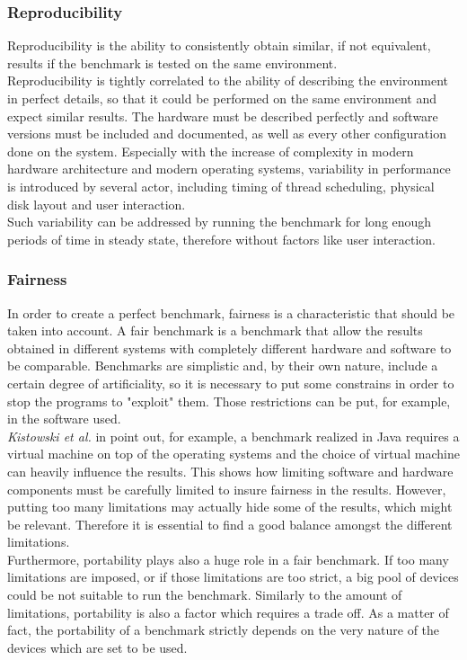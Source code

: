 \subsubsection{Reproducibility}
Reproducibility is the ability to consistently obtain similar, if not equivalent, results if the benchmark is tested on the same environment. \cite{how_to_bench}\\
Reproducibility is tightly correlated to the ability of describing the environment in perfect details, so that it could be performed on the same environment and expect similar results. The hardware must be described perfectly and software versions must be included and documented, as well as every other configuration done on the system. Especially with the increase of complexity in modern hardware architecture and modern operating systems, variability in performance is introduced by several actor, including  timing of thread scheduling, physical disk layout and  user interaction. \cite{how_to_bench}\\
Such variability can be addressed by running the benchmark for long enough periods of time in steady state, therefore without factors like user interaction. 


\subsubsection{Fairness}
In order to create a perfect benchmark, fairness is a characteristic that should be taken into account. A fair benchmark is a benchmark that allow the results obtained in different systems with completely different hardware and software to be comparable. Benchmarks are simplistic and, by their own nature, include a certain degree of artificiality, so it is necessary to put some constrains in order to stop the programs to "exploit" them. Those restrictions can be put, for example, in the software used.\\ 
\textit{Kistowski et al.} in \cite{how_to_bench} point out, for example, a benchmark realized in Java requires a virtual machine on top of the operating systems and the choice of virtual machine can heavily influence the results. This shows how limiting software and hardware components must be carefully limited to insure fairness in the results. However, putting too many limitations may actually hide some of the results, which might be relevant. \cite{how_to_bench} Therefore it is essential to find a good balance amongst the different limitations. \\
Furthermore, portability plays also a huge role in a fair benchmark. If too many limitations are imposed, or if those limitations are too strict, a big pool of devices could be not suitable to run the benchmark. Similarly to the amount of limitations, portability is also a factor which requires a trade off. As a matter of fact, the portability of a benchmark strictly depends on the very nature of the devices which are set to be used. 

